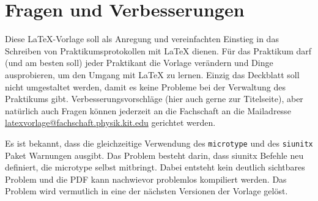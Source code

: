 \section{Fragen und Verbesserungen}
Diese LaTeX-Vorlage soll als Anregung und vereinfachten Einstieg in das Schreiben von Praktikumsprotokollen mit LaTeX dienen. Für das Praktikum darf (und am besten soll) jeder Praktikant die Vorlage verändern und Dinge ausprobieren, um den Umgang mit LaTeX zu lernen. Einzig das Deckblatt soll nicht umgestaltet werden, damit es keine Probleme bei der Verwaltung des Praktikums gibt. Verbesserungsvorschläge (hier auch gerne zur Titelseite), aber natürlich auch Fragen können jederzeit an die Fachschaft an die Mailadresse \href{mailto:latexvorlage@fachschaft.physik.kit.edu}{latexvorlage@fachschaft.physik.kit.edu} gerichtet werden.

Es ist bekannt, dass die gleichzeitige Verwendung des \verb|microtype| und des \verb|siunitx| Paket Warnungen ausgibt. Das Problem besteht darin, dass siunitx Befehle neu definiert, die microtype selbst mitbringt. Dabei entsteht kein deutlich sichtbares Problem und die PDF kann nachwievor problemlos kompiliert werden. Das Problem wird vermutlich in eine der nächsten Versionen der Vorlage gelöst.